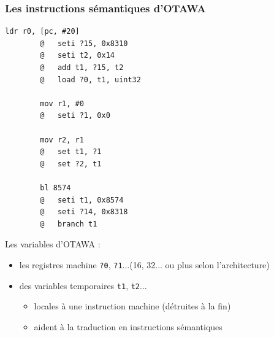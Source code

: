 \documentclass[table]{beamer}
\begin{document}
\begin{frame}[fragile]
    \frametitle{Les instructions sémantiques d'OTAWA}
    \begin{minipage}{.36\linewidth}
	\begin{lstlisting}[language={[ARM]Assembler}]
	    ldr r0, [pc, #20]
	    @	seti ?15, 0x8310
	    @	seti t2, 0x14
	    @	add t1, ?15, t2
	    @	load ?0, t1, uint32

	    mov r1, #0
	    @	seti ?1, 0x0

	    mov r2, r1
	    @	set t1, ?1
	    @	set ?2, t1

	    bl 8574
	    @	seti t1, 0x8574
	    @	seti ?14, 0x8318
	    @	branch t1
	\end{lstlisting}
    \end{minipage}
    \begin{minipage}{.62\linewidth}
	Les variables d'OTAWA :

	\begin{itemize}
	    \item les registres machine \texttt{?0}, \texttt{?1}...(16, 32... ou plus selon l'architecture)
	    \item des variables temporaires \texttt{t1}, \texttt{t2}...
	    \begin{itemize}
		\item locales à une instruction machine (détruites à la fin)
		\item aident à la traduction en instructions sémantiques
	    \end{itemize}
	\end{itemize}
    \end{minipage}
\end{frame}

\end{document}
